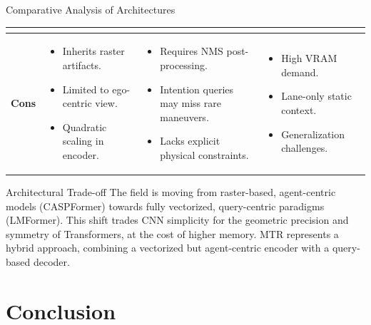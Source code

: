 \documentclass[10pt,aspectratio=169]{beamer}
\newcommand{\redominus}{\textcolor{myred}{\ding{55}}}
\begin{document}
\begin{frame}{Comparative Analysis of Architectures}
\begin{table}
\begin{tabular}{|p{1.9cm}|p{3.9cm}|p{3.9cm}|p{3.9cm}|}
\begin{itemize}
        \end{itemize} \\
        \hline
        \textbf{Cons} \redominus &
        \begin{itemize}
            \item Inherits raster artifacts.
            \item Limited to ego-centric view.
            \item Quadratic scaling in encoder.
        \end{itemize} &
        \begin{itemize}
            \item Requires NMS post-processing.
            \item Intention queries may miss rare maneuvers.
            \item Lacks explicit physical constraints.
        \end{itemize} &
        \begin{itemize}
            \item High VRAM demand.
            \item Lane-only static context.
            \item Generalization challenges.
        \end{itemize} \\
        \hline
    \end{tabular}
    \end{table}
    \begin{alertblock}{Architectural Trade-off}
        The field is moving from raster-based, agent-centric models (CASPFormer) towards fully vectorized, query-centric paradigms (LMFormer). This shift trades CNN simplicity for the geometric precision and symmetry of Transformers, at the cost of higher memory. MTR represents a hybrid approach, combining a vectorized but agent-centric encoder with a query-based decoder.
    \end{alertblock}
\end{frame}


\section{Conclusion}
\end{document}
